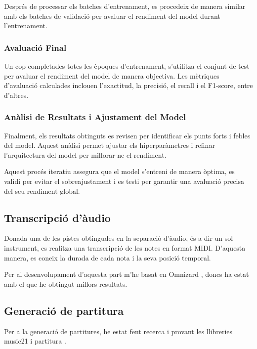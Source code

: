 \documentclass[10pt,a4paper,twocolumn,twoside]{article}
\begin{document}
Després de processar els batches d'entrenament, es procedeix de manera similar amb els batches de validació per avaluar el rendiment del model durant l'entrenament.

\subsubsection{Avaluació Final}

Un cop completades totes les èpoques d'entrenament, s'utilitza el conjunt de test per avaluar el rendiment del model de manera objectiva. Les mètriques d'avaluació calculades inclouen l'exactitud, la precisió, el recall i el F1-score, entre d'altres.

\subsubsection{Anàlisi de Resultats i Ajustament del Model}

Finalment, els resultats obtinguts es revisen per identificar els punts forts i febles del model. Aquest anàlisi permet ajustar els hiperparàmetres i refinar l'arquitectura del model per millorar-ne el rendiment.

Aquest procés iteratiu assegura que el model s'entreni de manera òptima, es validi per evitar el sobreajustament i es testi per garantir una avaluació precisa del seu rendiment global.


\subsection{Transcripció d'àudio}

Donada una de les pistes obtingudes en la separació d'àudio, és a dir un sol instrument, es realitza una transcripció de les notes en format MIDI. D'aquesta manera, es coneix la durada de cada nota i la seva posició temporal. \cite{music-transcription-app132111882} 

Per al desenvolupament d'aquesta part m'he basat en Omnizard \cite{Omnizard-Wu2021}, doncs ha estat amb el que he obtingut millors resultats.


\subsection{Generació de partitura}

Per a la generació de partitures, he estat fent recerca i provant les llibreries music21 \cite{music21-conf/ismir/CuthbertA10} i partitura \cite{partitura_mec}.
\end{document}
